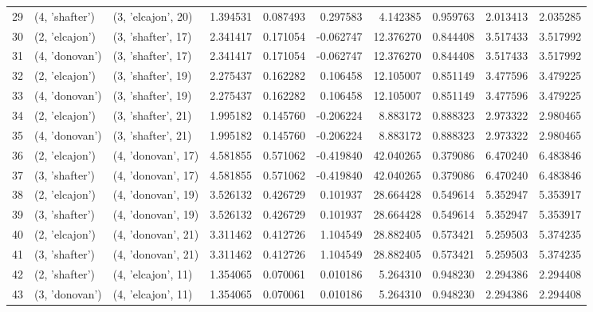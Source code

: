 \begin{tabular}{lllrrrrrrr}
29 &   (4, 'shafter') &  (3, 'elcajon', 20) &  1.394531 &   0.087493 &  0.297583 &   4.142385 &  0.959763 &   2.013413 &  2.035285 \\
30 &   (2, 'elcajon') &  (3, 'shafter', 17) &  2.341417 &   0.171054 & -0.062747 &  12.376270 &  0.844408 &   3.517433 &  3.517992 \\
31 &   (4, 'donovan') &  (3, 'shafter', 17) &  2.341417 &   0.171054 & -0.062747 &  12.376270 &  0.844408 &   3.517433 &  3.517992 \\
32 &   (2, 'elcajon') &  (3, 'shafter', 19) &  2.275437 &   0.162282 &  0.106458 &  12.105007 &  0.851149 &   3.477596 &  3.479225 \\
33 &   (4, 'donovan') &  (3, 'shafter', 19) &  2.275437 &   0.162282 &  0.106458 &  12.105007 &  0.851149 &   3.477596 &  3.479225 \\
34 &   (2, 'elcajon') &  (3, 'shafter', 21) &  1.995182 &   0.145760 & -0.206224 &   8.883172 &  0.888323 &   2.973322 &  2.980465 \\
35 &   (4, 'donovan') &  (3, 'shafter', 21) &  1.995182 &   0.145760 & -0.206224 &   8.883172 &  0.888323 &   2.973322 &  2.980465 \\
36 &   (2, 'elcajon') &  (4, 'donovan', 17) &  4.581855 &   0.571062 & -0.419840 &  42.040265 &  0.379086 &   6.470240 &  6.483846 \\
37 &   (3, 'shafter') &  (4, 'donovan', 17) &  4.581855 &   0.571062 & -0.419840 &  42.040265 &  0.379086 &   6.470240 &  6.483846 \\
38 &   (2, 'elcajon') &  (4, 'donovan', 19) &  3.526132 &   0.426729 &  0.101937 &  28.664428 &  0.549614 &   5.352947 &  5.353917 \\
39 &   (3, 'shafter') &  (4, 'donovan', 19) &  3.526132 &   0.426729 &  0.101937 &  28.664428 &  0.549614 &   5.352947 &  5.353917 \\
40 &   (2, 'elcajon') &  (4, 'donovan', 21) &  3.311462 &   0.412726 &  1.104549 &  28.882405 &  0.573421 &   5.259503 &  5.374235 \\
41 &   (3, 'shafter') &  (4, 'donovan', 21) &  3.311462 &   0.412726 &  1.104549 &  28.882405 &  0.573421 &   5.259503 &  5.374235 \\
42 &   (2, 'shafter') &  (4, 'elcajon', 11) &  1.354065 &   0.070061 &  0.010186 &   5.264310 &  0.948230 &   2.294386 &  2.294408 \\
43 &   (3, 'donovan') &  (4, 'elcajon', 11) &  1.354065 &   0.070061 &  0.010186 &   5.264310 &  0.948230 &   2.294386 &  2.294408 \\

\end{tabular}
